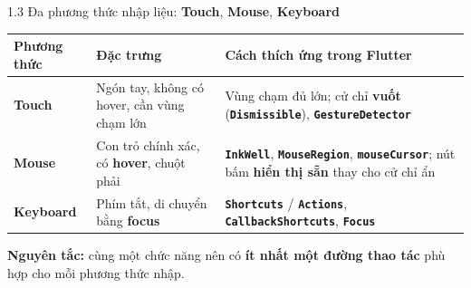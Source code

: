 \documentclass[aspectratio=169,10pt]{beamer}
\newcommand{\api}[1]{\texttt{\bfseries #1}}   %
\begin{document}
\begin{frame}{1.3 Đa phương thức nhập liệu: \textbf{Touch}, \textbf{Mouse}, \textbf{Keyboard}}
  \footnotesize
  \renewcommand{\arraystretch}{1.5}
  \centering
  \begin{tabular}{@{}>{\raggedright\arraybackslash}p{2.2cm}>{\raggedright\arraybackslash}p{4.2cm}>{\raggedright\arraybackslash}p{6.0cm}@{}}
    \hline
    \rowcolor{cHead}\textbf{Phương thức} & \textbf{Đặc trưng} & \textbf{Cách thích ứng trong Flutter}\\ \hline
    \textbf{Touch} & Ngón tay, không có hover, cần vùng chạm lớn & Vùng chạm đủ lớn; cử chỉ \textbf{vuốt} (\api{Dismissible}), \api{GestureDetector}\\ \hline
    \textbf{Mouse} & Con trỏ chính xác, có \textbf{hover}, chuột phải & \api{InkWell}, \api{MouseRegion}, \api{mouseCursor}; nút bấm \textbf{hiển thị sẵn} thay cho cử chỉ ẩn\\ \hline
    \textbf{Keyboard} & Phím tắt, di chuyển bằng \textbf{focus} & \api{Shortcuts} / \api{Actions}, \api{CallbackShortcuts}, \api{Focus}\\ \hline
  \end{tabular}

  \vspace{8pt}
  \small \textbf{Nguyên tắc:} cùng một chức năng nên có \textbf{ít nhất một đường thao tác} phù hợp cho mỗi phương thức nhập.
\end{frame}
\end{document}
